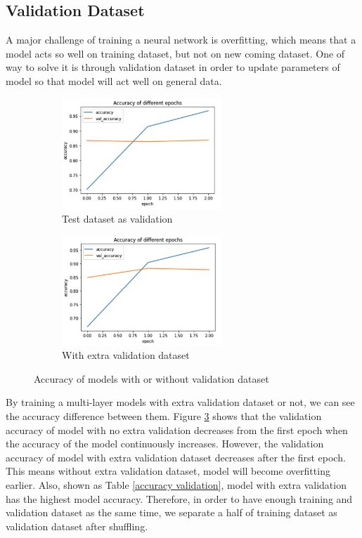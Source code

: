 \documentclass{article}
\begin{document}
\subsection{Validation Dataset}
A major challenge of training a neural network is overfitting, which means that a model acts so well on training dataset, but not on new coming dataset. One of way to solve it is through validation dataset in order to update parameters of model so that model will act well on general data. 
\FloatBarrier
\begin{figure}[htb]
\begin{subfigure}{.5\textwidth}
  \centering
  \includegraphics[width=6cm]{test as validation}
  \caption{Test dataset as validation}
  \label{fig: Test dataset as validation}
\end{subfigure}
\begin{subfigure}{.5\textwidth}
  \centering
  \includegraphics[width=6cm]{validation}
  \caption{With extra validation dataset}
  \label{fig:validation dataset}
\end{subfigure}
\caption{Accuracy of models with or without validation dataset}
\label{fig:Accuracy  val}
\end{figure}
\FloatBarrier
\noindent By training a multi-layer models with extra validation dataset or not, we can see the accuracy difference between them. Figure \ref{fig:Accuracy  val} shows that the validation accuracy of model with no extra validation decreases from the first epoch when the accuracy of the model continuously increases. However, the validation accuracy of model with extra validation dataset decreases after the first epoch. This means without extra validation dataset, model will become overfitting earlier. Also, shown as Table \ref{accuracy validation}, model with extra validation has the highest model accuracy. Therefore, in order to have enough training and validation dataset as the same time, we separate a half of training dataset as validation dataset after shuffling.
\end{document}
